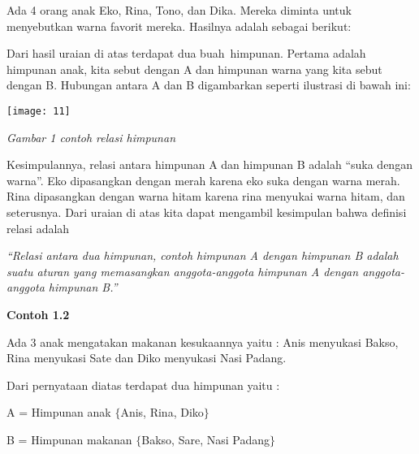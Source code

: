 \documentclass[11pt,fleqn]{book} %
\begin{document}
\begin{myEnumerate}
\begin{itemize}
\noindent Ada 4 orang anak Eko, Rina, Tono, dan Dika. Mereka diminta untuk menyebutkan warna favorit mereka. Hasilnya adalah sebagai berikut:

\noindent 

\noindent 

\noindent 

\noindent 

\noindent 

\noindent 

\noindent Dari hasil uraian di atas terdapat dua buah~himpunan. Pertama adalah himpunan anak, kita sebut dengan A dan himpunan warna yang kita sebut dengan B. Hubungan antara A dan B digambarkan seperti ilustrasi di bawah ini:

\noindent 

\begin{center}
\noindent \texttt{[image: 11]}
\end{center}

\noindent \textit{Gambar 1 contoh relasi himpunan}

\noindent 

\noindent Kesimpulannya, relasi antara himpunan A dan himpunan B adalah ``suka dengan warna''. Eko dipasangkan dengan merah karena eko suka dengan warna merah. Rina dipasangkan dengan warna hitam karena rina menyukai warna hitam, dan seterusnya. Dari uraian di atas kita dapat mengambil kesimpulan bahwa definisi relasi adalah

\noindent 

\noindent \textit{``Relasi antara dua himpunan, contoh himpunan A dengan himpunan B adalah suatu aturan yang memasangkan anggota-anggota himpunan A dengan anggota-anggota himpunan B.''}

\noindent 

\noindent 

\noindent \textbf{Contoh 1.2}

\noindent Ada 3 anak mengatakan makanan kesukaannya yaitu : Anis menyukasi Bakso, Rina menyukasi Sate dan Diko menyukasi Nasi Padang.

\noindent 

\noindent Dari pernyataan diatas terdapat dua himpunan yaitu :

\noindent A = Himpunan anak $\{$Anis, Rina, Diko$\}$

\noindent B = Himpunan makanan $\{$Bakso, Sare, Nasi Padang$\}$

\noindent 


\end{itemize}
\end{myEnumerate}
\end{document}
